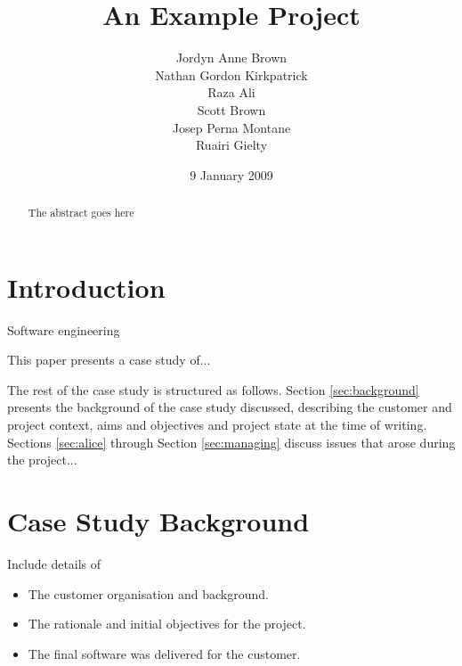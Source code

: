 \documentclass{l3proj}
\begin{document}
\title{An Example Project}

\author{Jordyn Anne Brown \\
        Nathan Gordon Kirkpatrick \\
        Raza Ali \\
        Scott Brown \\
        Josep Perna Montane\\
        Ruairi Gielty}
\date{9 January 2009}

\maketitle

\begin{abstract}

The abstract goes here

\end{abstract}

\educationalconsent

\newpage

\section{Introduction}

Software engineering

This paper presents a case study of...


The rest of the case study is structured as follows.  Section
\ref{sec:background} presents the background of the case study
discussed, describing the customer and project context, aims and
objectives and project state at the time of writing.  Sections
\ref{sec:alice} through Section \ref{sec:managing} discuss issues that
arose during the project...



\section{Case Study Background}

Include details of

\begin{itemize}
\item The customer organisation and background.
\item The rationale and initial objectives for the project.
\item The final software was delivered for the customer.
\end{itemize}
\end{document}
